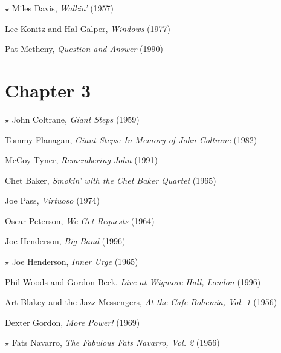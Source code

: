 \begin{compactitem}
    \item[$\star$] Miles Davis, \emph{Walkin'} (1957)
    \item Lee Konitz and Hal Galper, \emph{Windows} (1977)
    \item Pat Metheny, \emph{Question and Answer} (1990)
\end{compactitem}
\nocite{davis:walkin,konitz:windows,metheny:qa}

\section*{Chapter 3}

\vspace{-1em}
\begin{compactitem}
    \item[$\star$] John Coltrane, \emph{Giant Steps} (1959)
    \item Tommy Flanagan, \emph{Giant Steps: In Memory of John Coltrane} (1982)
    \item McCoy Tyner, \emph{Remembering John} (1991)
\end{compactitem}
\nocite{coltrane:giantsteps,flanagan:giantsteps,tyner:remembering}

\begin{compactitem}
    \item Chet Baker, \emph{Smokin' with the Chet Baker Quartet} (1965)
    \item Joe Pass, \emph{Virtuoso} (1974)
    \item Oscar Peterson, \emph{We Get Requests} (1964)
\end{compactitem}
\nocite{baker:smokin,pass:virtuoso,peterson:requests}


\begin{compactitem}
    \item Joe Henderson, \emph{Big Band} (1996)
    \item[$\star$] Joe Henderson, \emph{Inner Urge} (1965)
    \item Phil Woods and Gordon Beck, \emph{Live at Wigmore Hall, London} (1996)
\end{compactitem}
\nocite{henderson:bigband,henderson:isotope,woods:wigmore}

\begin{compactitem}
    \item Art Blakey and the Jazz Messengers, \emph{At the Cafe Bohemia,
        Vol. 1} (1956)
    \item Dexter Gordon, \emph{More Power!} (1969)
    \item[$\star$] Fats Navarro, \emph{The Fabulous Fats Navarro, Vol. 2} (1956)
\end{compactitem}
\nocite{blakey:bohemia,gordon:power,navarro:fabulous}

\clearpage


